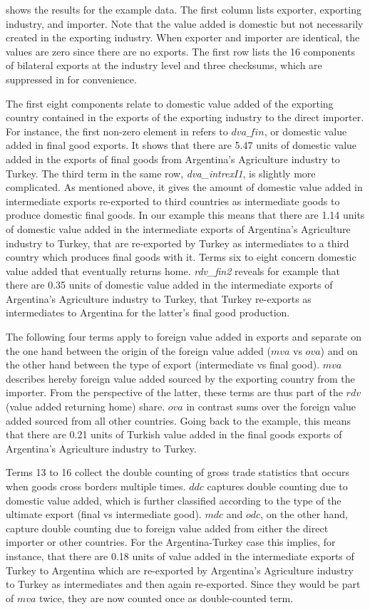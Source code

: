 \documentclass[a4paper,11pt]{article}
\begin{document}
 shows the results for the example data. 
The first column lists exporter, exporting industry, and importer. Note that the value added is domestic but not necessarily created in the exporting industry. When exporter and importer are identical, the values are zero since there are no exports. The first row lists the 16 components of bilateral exports at the industry level and three checksums, which are suppressed in  for convenience.

The first eight components relate to domestic value added of the exporting country contained in the exports of the exporting industry to the direct importer. For instance, the first non-zero element in  refers to $dva\_fin$, or domestic value added in final good exports. It shows that there are 5.47 units of domestic value added in the exports of final goods from Argentina's Agriculture industry to Turkey. The third term in the same row,  \textit{dva\_intrexI1}, is slightly more complicated. As mentioned above, it gives the amount of domestic value added in intermediate exports re-exported to third countries as intermediate goods to produce domestic final goods. In our example this means that there are 1.14 units of domestic value added in the intermediate exports of Argentina's Agriculture industry to Turkey, that are re-exported by Turkey as intermediates to a third country which produces final goods with it. Terms six to eight concern domestic value added that eventually returns home. \textit{rdv\_fin2} reveals for example that there are 0.35 units of domestic value added in the intermediate exports of Argentina's Agriculture industry to Turkey, 
that Turkey re-exports as intermediates to Argentina for the latter's final good production.

The following four terms apply to foreign value added in exports and separate on the one hand between the origin of the foreign value added ($mva$ vs $ova$) and on the other hand between the type of export (intermediate vs final good). $mva$ describes hereby foreign value added sourced by the exporting country from the importer. From the perspective of the latter, these terms are thus part of the $rdv$ (value added returning home) share. $ova$ in contrast sums over the foreign value added sourced from all other countries. Going back to the example, this means that there are 0.21 units of Turkish value added in the final goods exports of Argentina's Agriculture industry to Turkey.

Terms 13 to 16 collect the double counting of gross trade statistics that occurs when goods cross borders multiple times. $ddc$ captures double counting due to domestic value added, which is further classified according to the type of the ultimate export (final vs intermediate good). $mdc$ and $odc$, on the other hand, capture double counting due to foreign value added from either the direct importer or other countries. For the Argentina-Turkey case this implies, for instance, that there are 0.18 units of value added in the intermediate exports of Turkey to Argentina which are re-exported by Argentina's Agriculture industry to Turkey as intermediates and then again re-exported. Since they would be part of $mva$ twice, they are now counted once as double-counted term.
\end{document}
